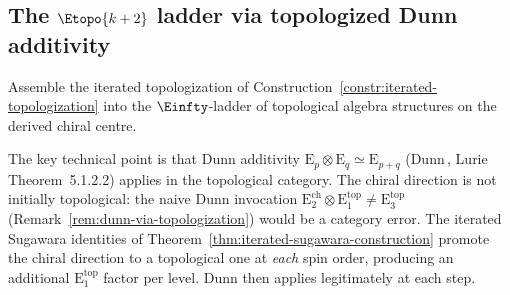 \subsection{The \texorpdfstring{$\Etopo{k+2}$}{E\_{k+2}-top} ladder
via topologized Dunn additivity}
\label{subsec:e-ladder-theorem}

Assemble the iterated topologization of
Construction~\ref{constr:iterated-topologization} into the $\Einfty$-ladder
of topological algebra structures on the derived chiral centre.

The key technical point is that Dunn additivity
$\mathrm{E}_p \otimes \mathrm{E}_q \simeq \mathrm{E}_{p+q}$
\textup{(}Dunn\,\cite{Dunn-additivity},
Lurie\,\cite{HA} Theorem~5.1.2.2\textup{)} applies in the topological
category. The chiral direction is not initially topological: the naive
Dunn invocation $\mathrm{E}^{\mathrm{ch}}_2 \otimes \mathrm{E}^{\mathrm{top}}_1 \ne
\mathrm{E}^{\mathrm{top}}_3$ (Remark~\ref{rem:dunn-via-topologization})
would be a category error. The iterated Sugawara identities
of Theorem~\ref{thm:iterated-sugawara-construction} promote the chiral
direction to a topological one at \emph{each} spin order, producing an
additional $\mathrm{E}^{\mathrm{top}}_1$ factor per level. Dunn then applies
legitimately at each step.

